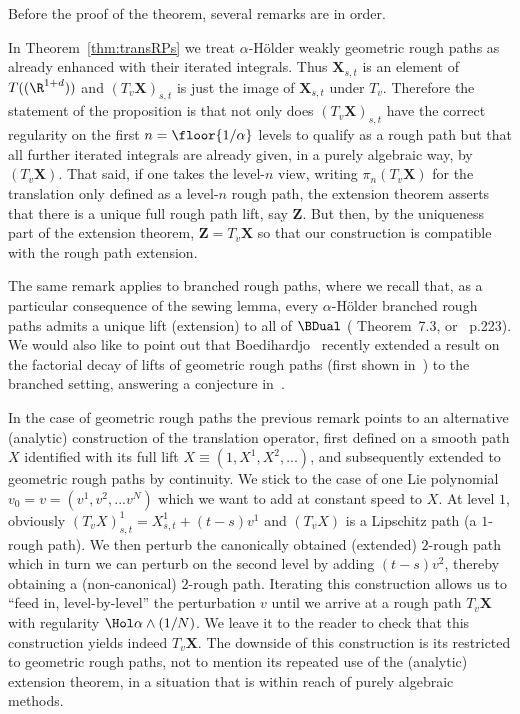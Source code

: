 \documentclass{article}
\begin{document}
Before the proof of the theorem, several remarks are in order.

\begin{remark}
In Theorem~\ref{thm:transRPs} we treat $\alpha$-H{\"older} weakly geometric rough paths as already enhanced with their iterated integrals. Thus $\mathbf{X}_{s,t}$ is an element of $T((\R^{1+d}))$ and $(T_v\mathbf{X})_{s,t}$ is just the image of $\mathbf{X}_{s,t}$ under $T_v$. Therefore the statement of the proposition is that not only does $(T_v\mathbf{X})_{s,t}$ have the correct regularity on the first $n=\floor{1/\alpha}$ levels to qualify as a rough path but that all further iterated integrals are already given, in a purely algebraic way, by $(T_v\mathbf{X})$. That said, if one takes the level-$n$ view, writing $\pi_{n} ( T_v\mathbf{X})$ for the translation only defined as a level-$n$ rough path, the extension theorem asserts that there is a unique full rough path lift, say $\mathbf{Z}$. But then, by the uniqueness part of the extension theorem, $\mathbf{Z} = T_v\mathbf{X}$ so that our construction is compatible with the rough path extension.

The same remark applies to branched rough paths, where we recall that, as a particular consequence of the sewing lemma, every $\alpha$-H{\"older} branched rough paths admits a unique lift (extension) to all of $\BDual$ (\cite{Gubinelli10} Theorem~7.3, or~\cite{HairerKelly15} p.223). We would also like to point out that Boedihardjo~\cite{Boedihardjo15} recently extended a result on the factorial decay of lifts of geometric rough paths (first shown in~\cite{Lyons98}) to the branched setting, answering a conjecture in~\cite{Gubinelli10}.
\end{remark}

\begin{remark}
In the case of geometric rough paths the previous remark points to an alternative (analytic) construction of the translation operator, first defined on a smooth path $X$ identified with its full lift $X \equiv (1,X^1,X^2, ...)$,  and subsequently extended to geometric rough paths by continuity. We stick to the case of one Lie polynomial $v_0 = v = (v^1,v^2,...v^N)$ which we want to add at constant speed to $X$. At level $1$, obviously $(T_v X)^1_{s,t} = X^1_{s,t} + (t-s) v^1$ and $(T_v X)$ is a Lipschitz path (a $1$-rough path). We then perturb the canonically obtained (extended) $2$-rough path which in turn we can perturb on the second level by adding $(t-s) v^2$, thereby obtaining a (non-canonical) $2$-rough path. Iterating this construction allows us to ``feed in, level-by-level'' the perturbation $v$ until we arrive at a rough path $T_v\mathbf{X}$ with regularity $\Hol \alpha \wedge (1/N)$. We leave it to the reader to check that this construction yields indeed $T_v\mathbf{X}$. The downside of this construction is its restricted to geometric rough paths, not to mention its repeated use of the (analytic) extension theorem, in a situation that is within reach of purely algebraic methods. 
\end{remark}
\end{document}
